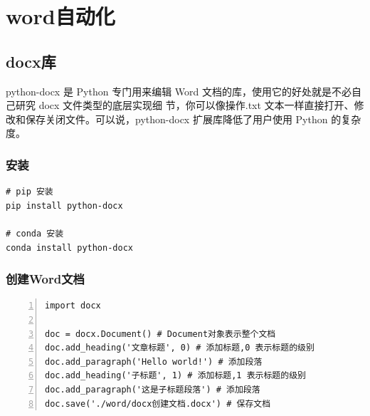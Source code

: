 \chapter{word自动化}
\label{cha:word自动化}

\section{docx库}
\label{sec:docx库}
python-docx 是 Python 专门用来编辑 Word 文档的库，使用它的好处就是不必自己研究 docx 文件类型的底层实现细
节，你可以像操作.txt 文本一样直接打开、修改和保存关闭文件。可以说，python-docx
扩展库降低了用户使用 Python 的复杂度。

\subsection{安装}
\label{subsec:docx库安装}
\begin{lstlisting}[style=demostyle,numbers=none]
# pip 安装
pip install python-docx

# conda 安装
conda install python-docx
\end{lstlisting}

\subsection{创建Word文档}
\label{subsec:docx创建Word文档}
\begin{lstlisting}[style=pythonstyle,numbers=left]
import docx

doc = docx.Document() # Document对象表示整个文档
doc.add_heading('文章标题', 0) # 添加标题,0 表示标题的级别
doc.add_paragraph('Hello world!') # 添加段落
doc.add_heading('子标题', 1) # 添加标题,1 表示标题的级别
doc.add_paragraph('这是子标题段落') # 添加段落
doc.save('./word/docx创建文档.docx') # 保存文档
\end{lstlisting}



